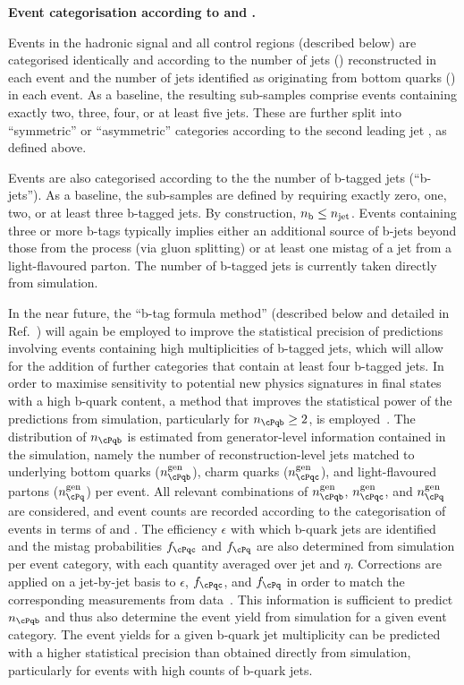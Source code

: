 {\bf Event categorisation according to \njet and \nb.} 

Events in the hadronic signal and all control regions (described
below) are categorised identically and according to the number of jets
(\njet) reconstructed in each event and the number of jets identified
as originating from bottom quarks (\nb) in each event. As a baseline,
the resulting sub-samples comprise events containing exactly two,
three, four, or at least five jets. These are further split into
``symmetric'' or ``asymmetric'' \njet categories according to the
second leading jet \Pt, as defined above.

Events are also categorised according to the the number of b-tagged
jets (``b-jets''). As a baseline, the sub-samples are defined by
requiring exactly zero, one, two, or at least three b-tagged jets. By
construction, $n_{\text{b}} \leq n_{\text{jet}}$. Events containing three or more b-tags
typically implies either an additional source of b-jets beyond those
from the \ttbar process (\eg via gluon splitting) or at least one
mistag of a jet from a light-flavoured parton. The number of b-tagged
jets is currently taken directly from simulation.

In the near future, the ``b-tag formula method'' (described below and
detailed in Ref.~\cite{Chatrchyan:2013lya}) will again be employed to
improve the statistical precision of predictions involving events
containing high multiplicities of b-tagged jets, which will allow for
the addition of further categories that contain at least four b-tagged
jets. In order to maximise sensitivity to potential new physics
signatures in final states with a high b-quark content, a method that
improves the statistical power of the predictions from simulation,
particularly for $n_\cPqb \ge 2$, is employed~\cite{Chatrchyan:2013lya}. The
distribution of $n_\cPqb$ is estimated from generator-level
information contained in the simulation, namely the number of
reconstruction-level jets matched to underlying bottom quarks
($n_\cPqb^\text{gen}$), charm quarks ($n_\cPqc^\text{gen}$), and
light-flavoured partons ($n_\cPq^\text{gen}$) per event. All relevant
combinations of $n_\cPqb^{\rm gen}$, $n_\cPqc^{\rm gen}$, and
$n_{\cPq}^{\rm gen}$ are considered, and event counts are recorded
according to the categorisation of events in terms of \njet and
\scalht. The efficiency $\epsilon$ with which b-quark jets are
identified and the mistag probabilities $f_\cPqc$ and $f_\cPq$ are
also determined from simulation per event category, with each quantity
averaged over jet \pt and $\eta$. Corrections are applied on a
jet-by-jet basis to $\epsilon$, $f_\cPqc$, and $f_\cPq$ in order to
match the corresponding measurements from
data~\cite{Chatrchyan:2012jua}. This information is sufficient to
predict $n_\cPqb$ and thus also determine the event yield from
simulation for a given event category. The event yields for a given
b-quark jet multiplicity can be predicted with a higher statistical
precision than obtained directly from simulation, particularly for
events with high counts of b-quark jets.

